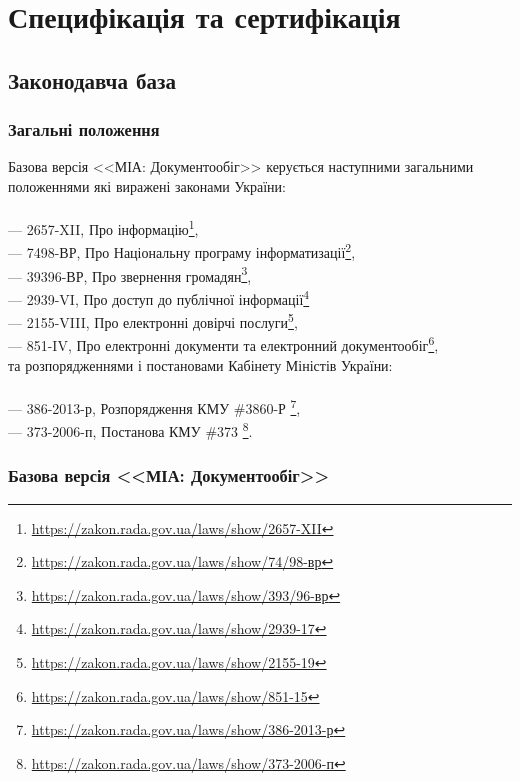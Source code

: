 \chapter{Специфікація та сертифікація}

\section{Законодавча база}

\subsection{Загальні положення}

Базова версія <<МІА: Документообіг>> керується наступними загальними положеннями які
виражені законами України:
\\
\\
--- {2657-XII}, Про інформацію\footnote{\url{https://zakon.rada.gov.ua/laws/show/2657-XII}}, \\
--- {74\/98-ВР}, Про Національну програму інформатизації\footnote{\url{https://zakon.rada.gov.ua/laws/show/74/98-вр}}, \\
--- {393\/96-ВР}, Про звернення громадян\footnote{\url{https://zakon.rada.gov.ua/laws/show/393/96-вр}}, \\
--- {2939-VI}, Про доступ до публічної інформації\footnote{\url{https://zakon.rada.gov.ua/laws/show/2939-17}} \\
--- {2155-VIII}, Про електронні довірчі послуги\footnote{\url{https://zakon.rada.gov.ua/laws/show/2155-19}}, \\
--- {851-IV}, Про електронні документи та електронний документообіг\footnote{\url{https://zakon.rada.gov.ua/laws/show/851-15}}, \\

та розпорядженнями і постановами Кабінету Міністів України:
\\
\\
--- {386-2013-р}, Розпорядження КМУ \#3860-Р \footnote{\url{https://zakon.rada.gov.ua/laws/show/386-2013-р}}, \\
--- {373-2006-п}, Постанова КМУ \#373 \footnote{\url{https://zakon.rada.gov.ua/laws/show/373-2006-п}}. \\

\newpage
\subsection{Базова версія <<МІА: Документообіг>>}

